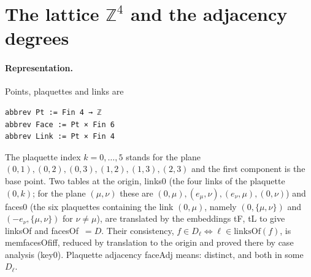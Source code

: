\documentclass[11pt,a4paper]{article}
\theoremstyle{definition}
\theoremstyle{remark}
\DeclareRobustCommand{\lean}[1]{{\ttfamily\renewcommand{\_}{\textunderscore\allowbreak}#1}}
\newenvironment{leanquote}{\par\smallskip\footnotesize}{\par\smallskip}
\begin{document}
\section{The lattice \texorpdfstring{$\mathbb{Z}^4$}{Z4} and the adjacency degrees}\label{sec:lattice}

\paragraph{Representation.} Points, plaquettes and links are
\begin{leanquote}
\begin{verbatim}
abbrev Pt := Fin 4 → ℤ
abbrev Face := Pt × Fin 6
abbrev Link := Pt × Fin 4
\end{verbatim}
\end{leanquote}
The plaquette index $k=0,\dots,5$ stands for the plane $(0,1),(0,2),(0,3),(1,2),(1,3),(2,3)$ and the first component is the base point. Two tables at the origin, \lean{links0} (the four links of the plaquette $(0,k)$; for the plane $(\mu,\nu)$ these are $(0,\mu),(e_\mu,\nu),(e_\nu,\mu),(0,\nu)$) and \lean{faces0} (the six plaquettes containing the link $(0,\mu)$, namely $(0,\{\mu,\nu\})$ and $(-e_\nu,\{\mu,\nu\})$ for $\nu\neq\mu$), are translated by the embeddings \lean{tF}, \lean{tL} to give \lean{linksOf} and \lean{facesOf}~$=D$. Their consistency, $f\in D_\ell\iff\ell\in\mathrm{linksOf}(f)$, is \lean{mem\_facesOf\_iff}, reduced by translation to the origin and proved there by case analysis (\lean{key0}). Plaquette adjacency \lean{faceAdj} means: distinct, and both in some $D_\ell$.
\end{document}
